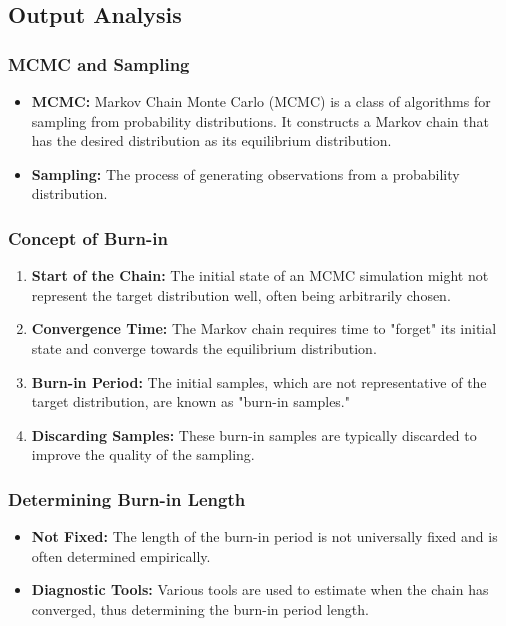 \documentclass{article}
\begin{document}
\subsection{Output Analysis}
\subsubsection{MCMC and Sampling}

\begin{itemize}
    \item \textbf{MCMC:} Markov Chain Monte Carlo (MCMC) is a class of algorithms for sampling from probability distributions. It constructs a Markov chain that has the desired distribution as its equilibrium distribution.
    \item \textbf{Sampling:} The process of generating observations from a probability distribution.
\end{itemize}

\subsubsection{Concept of Burn-in}

\begin{enumerate}
    \item \textbf{Start of the Chain:} The initial state of an MCMC simulation might not represent the target distribution well, often being arbitrarily chosen.
    \item \textbf{Convergence Time:} The Markov chain requires time to "forget" its initial state and converge towards the equilibrium distribution.
    \item \textbf{Burn-in Period:} The initial samples, which are not representative of the target distribution, are known as "burn-in samples."
    \item \textbf{Discarding Samples:} These burn-in samples are typically discarded to improve the quality of the sampling.
\end{enumerate}

\subsubsection{Determining Burn-in Length}

\begin{itemize}
    \item \textbf{Not Fixed:} The length of the burn-in period is not universally fixed and is often determined empirically.
    \item \textbf{Diagnostic Tools:} Various tools are used to estimate when the chain has converged, thus determining the burn-in period length.
\end{itemize}
\end{document}
